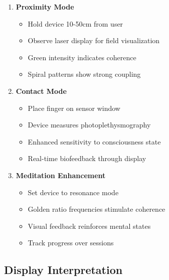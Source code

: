 \documentclass[12pt,a4paper]{article}
\begin{document}
\begin{enumerate}
\item \textbf{Proximity Mode}
    \begin{itemize}
    \item Hold device 10-50cm from user
    \item Observe laser display for field visualization
    \item Green intensity indicates coherence
    \item Spiral patterns show strong coupling
    \end{itemize}

\item \textbf{Contact Mode}
    \begin{itemize}
    \item Place finger on sensor window
    \item Device measures photoplethysmography
    \item Enhanced sensitivity to consciousness state
    \item Real-time biofeedback through display
    \end{itemize}

\item \textbf{Meditation Enhancement}
    \begin{itemize}
    \item Set device to resonance mode
    \item Golden ratio frequencies stimulate coherence
    \item Visual feedback reinforces mental states
    \item Track progress over sessions
    \end{itemize}
\end{enumerate}

\subsection{Display Interpretation}
\end{document}
